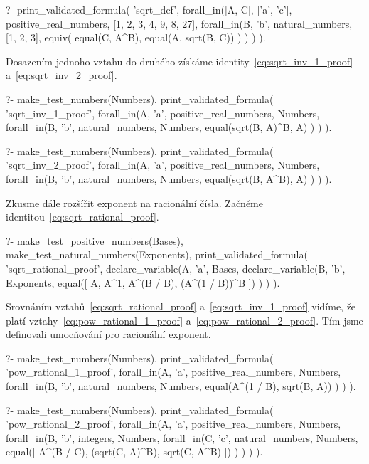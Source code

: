 \begin{prolog}
?-	print_validated_formula(
		'sqrt_def',
		forall_in([A, C], ['a', 'c'], positive_real_numbers, [1, 2, 3, 4, 9, 8, 27],
			forall_in(B, 'b', natural_numbers, [1, 2, 3],
				equiv(
					equal(C, A^B),
					equal(A, sqrt(B, C))
				)
			)
		)
	).				
\end{prolog}

Dosazením jednoho vztahu do druhého získáme identity~\eqref{eq:sqrt_inv_1_proof} a~\eqref{eq:sqrt_inv_2_proof}.

\begin{prolog}
?-	make_test_numbers(Numbers),
	print_validated_formula(
		'sqrt_inv_1_proof',
		forall_in(A, 'a', positive_real_numbers, Numbers,
			forall_in(B, 'b', natural_numbers, Numbers,
				equal(sqrt(B, A)^B, A)
			)
		)
	).				
\end{prolog}
\begin{prolog}
?-	make_test_numbers(Numbers),
	print_validated_formula(
		'sqrt_inv_2_proof',
		forall_in(A, 'a', positive_real_numbers, Numbers,
			forall_in(B, 'b', natural_numbers, Numbers,
				equal(sqrt(B, A^B), A)
			)
		)
	).				
\end{prolog}

Zkusme dále rozšířit exponent na racionální čísla. Začněme identitou~\eqref{eq:sqrt_rational_proof}.

\begin{prolog}
?-	make_test_positive_numbers(Bases),
	make_test_natural_numbers(Exponents),
	print_validated_formula(
		'sqrt_rational_proof',
		declare_variable(A, 'a', Bases,
			declare_variable(B, 'b', Exponents,
				equal([
					A,
					A^1,
					A^(B / B),
					(A^(1 / B))^B
				])
			)
		)
	).				
\end{prolog}

Srovnáním vztahů~\eqref{eq:sqrt_rational_proof} a~\eqref{eq:sqrt_inv_1_proof} vidíme, že platí vztahy~\eqref{eq:pow_rational_1_proof} a~\eqref{eq:pow_rational_2_proof}. Tím jsme definovali umocňování pro racionální exponent.

\begin{prolog}
?-	make_test_numbers(Numbers),
	print_validated_formula(
		'pow_rational_1_proof',
		forall_in(A, 'a', positive_real_numbers, Numbers,
			forall_in(B, 'b', natural_numbers, Numbers,
				equal(A^(1 / B), sqrt(B, A))
			)
		)
	).				
\end{prolog}
\begin{prolog}
?-	make_test_numbers(Numbers),
	print_validated_formula(
		'pow_rational_2_proof',
		forall_in(A, 'a', positive_real_numbers, Numbers,
			forall_in(B, 'b', integers, Numbers,
				forall_in(C, 'c', natural_numbers, Numbers,
					equal([
						A^(B / C),
						(sqrt(C, A)^B),
						sqrt(C, A^B)
					])
				)
			)
		)
	).				
\end{prolog}

